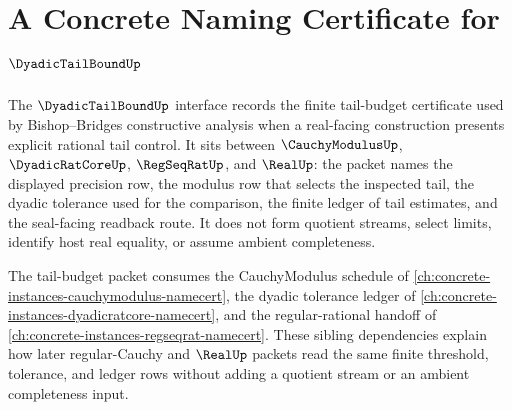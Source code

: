 \chapter{A Concrete Naming Certificate for $\DyadicTailBoundUp$}
\label{ch:concrete-instances-dyadictailbound-namecert}

The $\DyadicTailBoundUp$ interface records the finite tail-budget certificate used by Bishop--Bridges constructive analysis when a real-facing construction presents explicit rational tail control. It sits between $\CauchyModulusUp$, $\DyadicRatCoreUp$, $\RegSeqRatUp$, and $\RealUp$: the packet names the displayed precision row, the modulus row that selects the inspected tail, the dyadic tolerance used for the comparison, the finite ledger of tail estimates, and the seal-facing readback route. It does not form quotient streams, select limits, identify host real equality, or assume ambient completeness.

The tail-budget packet consumes the CauchyModulus schedule of \autoref{ch:concrete-instances-cauchymodulus-namecert}, the dyadic tolerance ledger of \autoref{ch:concrete-instances-dyadicratcore-namecert}, and the regular-rational handoff of \autoref{ch:concrete-instances-regseqrat-namecert}. These sibling dependencies explain how later regular-Cauchy and $\RealUp$ packets read the same finite threshold, tolerance, and ledger rows without adding a quotient stream or an ambient completeness input.

